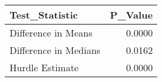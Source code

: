 \begin{table}
\centering\begingroup\fontsize{6}{8}\selectfont

\begin{tabular}{lr}
\toprule
Test\_Statistic & P\_Value\\
\midrule
Difference in Means & 0.0000\\
Difference in Medians & 0.0162\\
Hurdle Estimate & 0.0000\\
\bottomrule
\end{tabular}
\endgroup{}
\end{table}
